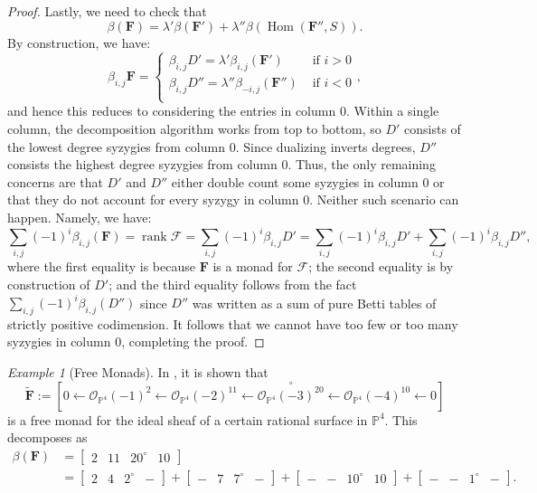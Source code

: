 \documentclass[12pt]{amsart}
\theoremstyle{definition}
\theoremstyle{remark}
\newtheorem{example}[lemma]{Example}
\newcommand{\Hom}{\operatorname{Hom}} %
\newcommand{\rank}{\operatorname{rank}}
\newcommand{\PP}{\mathbb{P}}
\newcommand{\cO}{\mathcal{O}}
\newcommand{\cF}{\mathcal{F}}
\newcommand{\FF}{\mathbf{F}}
\newcommand{\zp}{\circ}
\begin{document}
\begin{proof}
Lastly, we need to check that
\[
\beta(\FF)=\lambda'\beta(\FF')+\lambda''\beta(\Hom(\FF'',S)).
\]
By construction, we have:
\[
\beta_{i,j}\FF=\begin{cases}
\beta_{i,j}D'=\lambda'\beta_{i,j}(\FF') &\text{ if } i>0\\
\beta_{i,j}D''=\lambda''\beta_{-i,j}(\FF'') &\text{ if } i<0\\
\end{cases},
\]
and hence this reduces to considering the entries in column $0$.  Within a single column, the decomposition algorithm works from top to bottom, so $D'$ consists of the lowest degree syzygies from column $0$.  Since dualizing inverts degrees, $D''$ consists the highest degree syzygies from column $0$.  Thus, the only remaining concerns are that $D'$ and $D''$ either double count some syzygies in column $0$ or that they do not account for every syzygy in column $0$.  Neither such scenario can happen.  Namely, we have:
\[
\sum_{i,j} (-1)^i \beta_{i,j}(\FF)=\rank \cF=\sum_{i,j} (-1)^i\beta_{i,j}D'=\sum_{i,j} (-1)^i\beta_{i,j}D'+\sum_{i,j} (-1)^i\beta_{i,j}D'',
\]
where the first equality is because $\FF$ is a monad for $\cF$; the second equality is by construction of $D'$; and the third equality follows from the fact $\sum_{i,j}(-1)^i\beta_{i,j}(D'')$ since $D''$ was written as a sum of pure Betti tables of strictly positive codimension.  It follows that we cannot have too few or too many syzygies in column $0$, completing the proof.
\end{proof}

\begin{example}[Free Monads]\label{ex:monads}
In \cite[Example 8.2]{eis-floy-schrey}, it is shown that
\[
\widetilde{\FF}:=\left[0\gets \cO_{\PP^4}(-1)^2 \gets  \cO_{\PP^4}(-2)^{11}\gets \overset{\zp}{\cO_{\PP^4}(-3)^{20}}\gets \cO_{\PP^4}(-4)^{10}\gets 0 \right]
\]
is a free monad for the ideal sheaf of a certain rational surface in $\PP^4$.  This decomposes as
\begin{align*}
\beta(\FF)&=
\begin{bmatrix}
2&11&20^\zp&10
\end{bmatrix}
\\
&=
\begin{bmatrix}
2&4&2^\zp&-
\end{bmatrix}
+
\begin{bmatrix}
-&7&7^\zp&-
\end{bmatrix}
+
\begin{bmatrix}
-&-&10^\zp&10
\end{bmatrix}
+
\begin{bmatrix}
-&-&1^\zp&-
\end{bmatrix}.
\end{align*}
\end{example}
\end{document}
